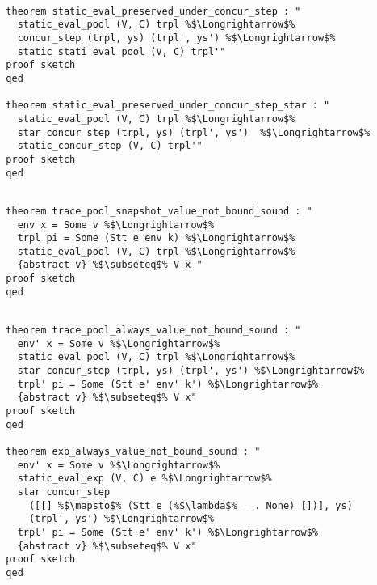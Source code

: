 \documentclass{article}
\begin{document}
\begin{lstlisting}[style=codestyle1, escapechar=\%]

  theorem static_eval_preserved_under_concur_step : "
    static_eval_pool (V, C) trpl %$\Longrightarrow$% 
    concur_step (trpl, ys) (trpl', ys') %$\Longrightarrow$%
    static_stati_eval_pool (V, C) trpl'"
  proof sketch
  qed

  theorem static_eval_preserved_under_concur_step_star : "
    static_eval_pool (V, C) trpl %$\Longrightarrow$% 
    star concur_step (trpl, ys) (trpl', ys')  %$\Longrightarrow$% 
    static_concur_step (V, C) trpl'"
  proof sketch
  qed
  \end{lstlisting}

\begin{lstlisting}[style=codestyle1, escapechar=\%]

  theorem trace_pool_snapshot_value_not_bound_sound : "
    env x = Some v %$\Longrightarrow$%
    trpl pi = Some (Stt e env k) %$\Longrightarrow$%
    static_eval_pool (V, C) trpl %$\Longrightarrow$%
    {abstract v} %$\subseteq$% V x "
  proof sketch
  qed
  \end{lstlisting}

\begin{lstlisting}[style=codestyle1, escapechar=\%]

  theorem trace_pool_always_value_not_bound_sound : "
    env' x = Some v %$\Longrightarrow$%
    static_eval_pool (V, C) trpl %$\Longrightarrow$% 
    star concur_step (trpl, ys) (trpl', ys') %$\Longrightarrow$%
    trpl' pi = Some (Stt e' env' k') %$\Longrightarrow$%
    {abstract v} %$\subseteq$% V x"
  proof sketch
  qed

  theorem exp_always_value_not_bound_sound : "
    env' x = Some v %$\Longrightarrow$%
    static_eval_exp (V, C) e %$\Longrightarrow$%
    star concur_step
      ([[] %$\mapsto$% (Stt e (%$\lambda$% _ . None) [])], ys)
      (trpl', ys') %$\Longrightarrow$%
    trpl' pi = Some (Stt e' env' k') %$\Longrightarrow$%
    {abstract v} %$\subseteq$% V x"
  proof sketch
  qed

  \end{lstlisting}
\end{document}
